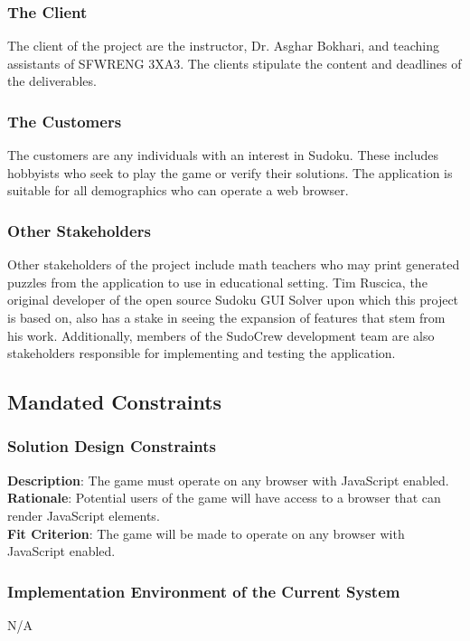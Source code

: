 \documentclass[11pt]{article}
\begin{document}
\subsubsection{The Client}
The client of the project are the instructor, Dr. Asghar Bokhari, and teaching assistants of SFWRENG 3XA3. The clients stipulate the content and deadlines of the deliverables.

\subsubsection{The Customers}
The customers are any individuals with an interest in Sudoku. These includes hobbyists who seek to play the game or verify their solutions. The application is suitable for all demographics who can operate a web browser.

\subsubsection{Other Stakeholders}
Other stakeholders of the project include math teachers who may print generated puzzles from the application to use in educational setting. Tim Ruscica, the original developer of the open source Sudoku GUI Solver upon which this project is based on, also has a stake in seeing the expansion of features that stem from his work. Additionally, members of the SudoCrew development team are also stakeholders responsible for implementing and testing the application.

\subsection{Mandated Constraints}
\subsubsection{Solution Design Constraints}
\textbf{Description}: The game must operate on any browser with JavaScript enabled.
\\
\textbf{Rationale}: Potential users of the game will have access to a browser that can render JavaScript elements.
\\
\textbf{Fit Criterion}: The game will be made to operate on any browser with JavaScript enabled.

\subsubsection{Implementation Environment of the Current System}
N/A
\end{document}
